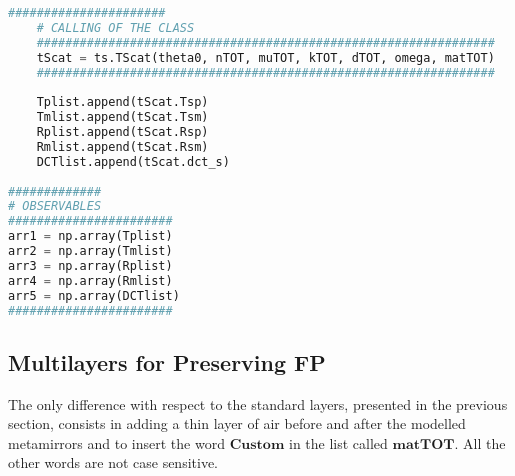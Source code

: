 \documentclass[showpacs,aps,prl,onecolumn,superscriptaddress]{revtex4-1}
\begin{document}
\begin{lstlisting}[language=Python, caption=Layers of a standard FP.]
    ######################
    # CALLING OF THE CLASS
    ################################################################
    tScat = ts.TScat(theta0, nTOT, muTOT, kTOT, dTOT, omega, matTOT)  
    ################################################################
    
    Tplist.append(tScat.Tsp)
    Tmlist.append(tScat.Tsm)
    Rplist.append(tScat.Rsp)
    Rmlist.append(tScat.Rsm)
    DCTlist.append(tScat.dct_s)
    
#############
# OBSERVABLES
#######################    
arr1 = np.array(Tplist)
arr2 = np.array(Tmlist)
arr3 = np.array(Rplist)
arr4 = np.array(Rmlist)
arr5 = np.array(DCTlist)
#######################
\end{lstlisting}
\subsection{Multilayers for Preserving FP}
The only difference with respect to the standard layers, presented in the previous section, consists in adding a thin layer of air before and after the modelled metamirrors and to insert the word $\mathbf{Custom}$ in the list called $\mathbf{matTOT}$. All the other words are not case sensitive.
\end{document}
